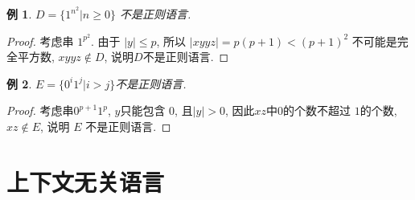 \documentclass[8pt]{article}
\theoremstyle{compact}
\newtheorem{example}{例}[section]
\def\le{\leqslant}
\def\ge{\geqslant}
\begin{document}
\begin{example}
	$D = \{1^{n^2} | n \ge 0\}$ 不是正则语言.
\end{example}
\begin{proof}
	考虑串 $1^{p^2}$. 由于 $|y| \le p$, 所以 $|xyyz| = p(p+1) < (p+1)^2$ 不可能是完全平方数, $xyyz \notin D$, 说明$D$不是正则语言.
\end{proof}
\begin{example}
	$E = \{0^i1^j | i > j\}$不是正则语言. 
\end{example}
\begin{proof}
	考虑串$0^{p+1}1^p$, $y$只能包含 $0$, 且$|y| > 0$, 因此$xz$中$0$的个数不超过 $1$的个数, $xz \notin E$, 说明 $E$ 不是正则语言.
\end{proof}
\newpage
\section{上下文无关语言}
\end{document}
